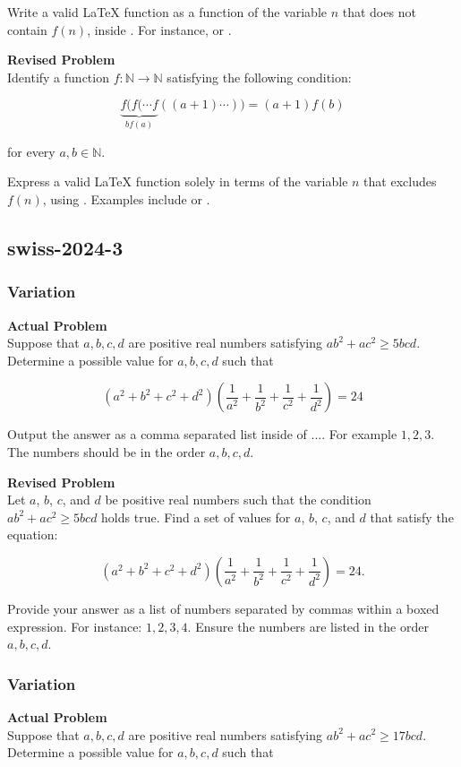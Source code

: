 Write a valid LaTeX function as a function of the variable $n$ that does not contain $f(n)$, inside \boxed. For instance,  or .

\textbf{Revised Problem}\\
Identify a function \( f: \mathbb{N} \rightarrow \mathbb{N} \) satisfying the following condition:

$$\underbrace{f(f(\cdots f}_{b f(a)}((a+1) \cdots)) = (a+1)f(b)$$

for every \( a, b \in \mathbb{N} \).

Express a valid LaTeX function solely in terms of the variable \( n \) that excludes \( f(n) \), using \boxed. Examples include  or .

\subsection{swiss-2024-3}
\subsubsection{Variation}
\textbf{Actual Problem}\\
Suppose that $a,b,c,d$ are positive real numbers satisfying $ab^2 + ac^2 \geq 5bcd$. Determine a possible value for $a,b,c,d$ such that

$$(a^2+b^2+c^2+d^2)\left(\frac{1}{a^2}+\frac{1}{b^2}+\frac{1}{c^2}+\frac{1}{d^2}\right) = 24$$

Output the answer as a comma separated list inside of $\boxed{...}$. For example $\boxed{1, 2, 3}$.
The numbers should be in the order $a,b,c,d$.

\textbf{Revised Problem}\\
Let \(a\), \(b\), \(c\), and \(d\) be positive real numbers such that the condition \(ab^2 + ac^2 \geq 5bcd\) holds true. Find a set of values for \(a\), \(b\), \(c\), and \(d\) that satisfy the equation:

$$(a^2+b^2+c^2+d^2)\left(\frac{1}{a^2}+\frac{1}{b^2}+\frac{1}{c^2}+\frac{1}{d^2}\right) = 24.$$

Provide your answer as a list of numbers separated by commas within a boxed expression. For instance: \(\boxed{1, 2, 3, 4}\). Ensure the numbers are listed in the order \(a, b, c, d\).

\subsubsection{Variation}
\textbf{Actual Problem}\\
Suppose that $a,b,c,d$ are positive real numbers satisfying $ab^2 + ac^2 \geq 17bcd$. Determine a possible value for $a,b,c,d$ such that

